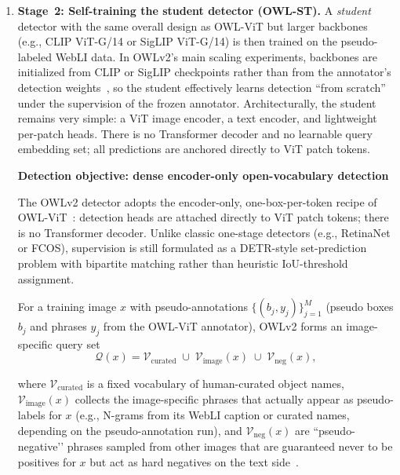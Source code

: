 \begin{enrichment}
\begin{enrichment}
\begin{enumerate}
			\item \textbf{Stage~2: Self-training the student detector (OWL-ST).}
			A \emph{student} detector with the same overall design as OWL-ViT but larger backbones (e.g., CLIP ViT-G/14 or SigLIP ViT-G/14) is then trained on the pseudo-labeled WebLI data.
			In OWLv2’s main scaling experiments, backbones are initialized from CLIP or SigLIP checkpoints rather than from the annotator’s detection weights~\cite{minderer2024_owlvitv2}, so the student effectively learns detection ``from scratch'' under the supervision of the frozen annotator.
			Architecturally, the student remains very simple: a ViT image encoder, a text encoder, and lightweight per-patch heads.
			There is no Transformer decoder and no learnable query embedding set; all predictions are anchored directly to ViT patch tokens.
			
			\medskip
			
			\noindent
			\textbf{Detection objective: dense encoder-only open-vocabulary detection}
			
			The OWLv2 detector adopts the encoder-only, one-box-per-token recipe of OWL-ViT~\cite{minderer2022_owlvit,minderer2024_owlvitv2}: detection heads are attached directly to ViT patch tokens; there is no Transformer decoder. Unlike classic one-stage detectors (e.g., RetinaNet or FCOS), supervision is still formulated as a DETR-style set-prediction problem with bipartite matching rather than heuristic IoU-threshold assignment.
			
			For a training image $x$ with pseudo-annotations $\{(b_j, y_j)\}_{j=1}^M$ (pseudo boxes $b_j$ and phrases $y_j$ from the OWL-ViT annotator), OWLv2 forms an image-specific query set
			\[
			\mathcal{Q}(x)
			=
			\mathcal{V}_{\text{curated}}
			\;\cup\;
			\mathcal{V}_{\text{image}}(x)
			\;\cup\;
			\mathcal{V}_{\text{neg}}(x),
			\]
			
			\newpage
			
			where $\mathcal{V}_{\text{curated}}$ is a fixed vocabulary of human-curated object names, $\mathcal{V}_{\text{image}}(x)$ collects the image-specific phrases that actually appear as pseudo-labels for $x$ (e.g., N-grams from its WebLI caption or curated names, depending on the pseudo-annotation run), and $\mathcal{V}_{\text{neg}}(x)$ are “pseudo-negative’’ phrases sampled from other images that are guaranteed never to be positives for $x$ but act as hard negatives on the text side~\cite{minderer2024_owlvitv2}.
			

\end{enumerate}
\end{enrichment}
\end{enrichment}
